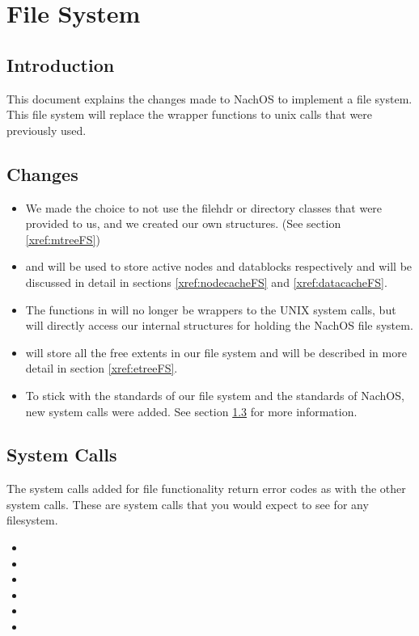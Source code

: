 \chapter{File System}
\section{Introduction}
\label{xref:introFS}
  This document explains the changes made to NachOS to implement a file system.
  This file system will replace the wrapper functions to unix calls that
  were previously used.

\section{Changes}
\label{xref:changesFS}
  \begin{itemize}
    \item	We made the choice to not use the filehdr or directory 
		classes that were 
		provided to us, and we created our own structures. (See section
		\ref{xref:mtreeFS})
    \item	{} and  will be used to store
		active nodes and datablocks respectively and will be discussed
		in detail in sections \ref{xref:nodecacheFS} and 
		\ref{xref:datacacheFS}.
    \item	The functions in  will no longer be wrappers to
		the UNIX system calls, but will directly access our internal
		structures for holding the NachOS file system.
    \item	{} will store all the free extents in our file system
		and will be described in more detail in section 
		\ref{xref:etreeFS}.
    \item	To stick with the standards of our file system and the standards
		of NachOS, new system calls were added.  See section 
		\ref{xref:syscallsFS} for more information.
  \end{itemize} 

\section{System Calls}
\label{xref:syscallsFS}
  The system calls added for file functionality return error codes as with
  the other system calls.  These are system calls that you would expect to see
  for any filesystem.
  \\
  \begin{itemize}
      \item	{}
      \item	{}
      \item     {}
      \item     {}
      \item     {}
      \item     {}
  \end{itemize}

